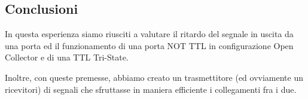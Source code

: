 \subsection*{Conclusioni}

In questa esperienza siamo riusciti a valutare il ritardo del segnale in uscita da una porta ed il funzionamento di una porta NOT TTL in configurazione Open Collector e di una TTL Tri-State.

Inoltre, con queste premesse, abbiamo creato un trasmettitore (ed ovviamente un ricevitori) di segnali che sfruttasse in maniera efficiente i collegamenti fra i due.